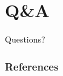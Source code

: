 \documentclass{beamer}
\begin{document}
\section{Q\&A}

\begin{frame}[c]
\begin{center}
\Huge Questions?
\end{center}
\end{frame}

\begin{frame}[allowframebreaks]
        \frametitle{References}
        
        
\end{frame}
\end{document}

